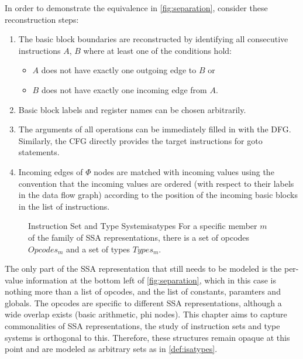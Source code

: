     In order to demonstrate the equivalence in \autoref{fig:separation},
    consider these reconstruction steps:
\begin{enumerate}
    \item The basic block boundaries are reconstructed by identifying all
          consecutive instructions $A$, $B$ where at least one of the
    conditions hold:
    \begin{itemize}
        \item $A$ does not have exactly one outgoing edge to $B$ or
        \item $B$ does not have exactly one incoming edge from $A$.
    \end{itemize}
    \item Basic block labels and register names can be chosen arbitrarily.
    \item The arguments of all operations can be immediately filled in with the 
          DFG. Similarly, the CFG directly provides the target instructions
          for goto statements.
    \item Incoming edges of $\Phi$ nodes are matched with incoming values using
          the convention that the incoming values are ordered (with respect to
          their labels in the data flow graph) according to the position of the
          incoming basic blocks in the list of instructions.
\end{enumerate}

\begin{figure}[b]
\begin{definition}{Instruction Set and Type System}{isatypes}
    For a specific member $m$ of the family of SSA representations, there is
    a set of opcodes $Opcodes_m$ and a set of types $Types_m$.
\end{definition}
\end{figure}

    The only part of the SSA representation that still needs to be modeled is
    the per-value information at the bottom left of \autoref{fig:separation},
    which in this case is nothing more than a list of opcodes, and the list of
    constants, paramters and globals.
    The opcodes are specific to different SSA representations, although a wide
    overlap exists (basic arithmetic, phi nodes).
    This chapter aims to capture commonalities of SSA representations, the study
    of instruction sets and type systems is orthogonal to this.
    Therefore, these structures remain opaque at this point and are modeled as
    arbitrary sets as in \autoref{def:isatypes}.


